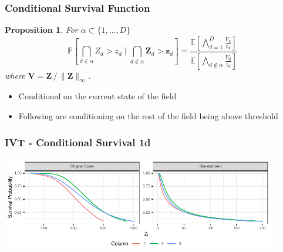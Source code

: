 \documentclass[aspectratio=169,10pt]{beamer}
\newtheorem{prop}{Proposition}
\newlength{\frametextheight}
\begin{document}
\begin{frame}
  \frametitle{Conditional Survival Function}
  \begin{prop}
      For $\alpha \subset \lbrace 1, \ldots, D\rbrace$
    \[
        \mathbb{P}\left[\bigcap_{d\in\alpha}Z_{d} > z_d\mid \bigcap_{d\not\in\alpha}\bm{Z}_{d} > \bm{z}_{d}\right] =
        \frac{\mathbb{E}\left[\bigwedge_{d = 1}^D \frac{V_k}{z_k}\right]}{
                      \mathbb{E}\left[\bigwedge_{d\not\in\alpha}\frac{V_d}{z_d}\right]}
    \]
      where $\bm{V} = \bm{Z}\,/\,\lVert\bm{Z}\rVert_{\infty}$.
  \end{prop}
  \begin{itemize}
      \item Conditional on the current state of the field
      \item Following are conditioning on the rest of the field being above threshold
  \end{itemize}
\end{frame} %

\begin{frame}
  \frametitle{IVT - Conditional Survival 1d}
  \begin{center}
    \includegraphics[height=0.8\frametextheight,width=0.9\textwidth]{./ch1/images/condsurv_1d}
  \end{center}
\end{frame} %
\end{document}

